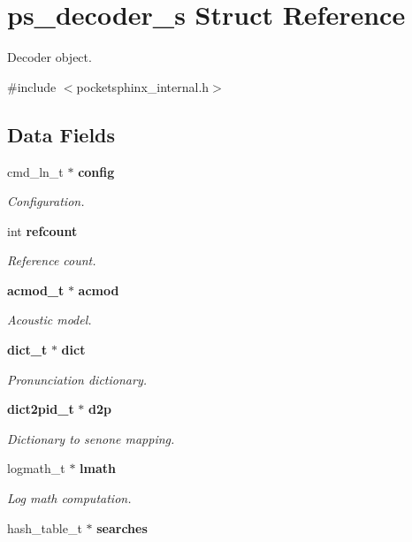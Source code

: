 \section{ps\+\_\+decoder\+\_\+s Struct Reference}
\label{structps__decoder__s}


Decoder object.  




{\ttfamily \#include $<$pocketsphinx\+\_\+internal.\+h$>$}

\subsection*{Data Fields}
\begin{DoxyCompactItemize}
\item 
cmd\+\_\+ln\+\_\+t $\ast$ \textbf{ config}
\begin{DoxyCompactList}\small\item\em Configuration. \end{DoxyCompactList}\item 
int \textbf{ refcount}
\begin{DoxyCompactList}\small\item\em Reference count. \end{DoxyCompactList}\item 
\textbf{ acmod\+\_\+t} $\ast$ \textbf{ acmod}
\begin{DoxyCompactList}\small\item\em Acoustic model. \end{DoxyCompactList}\item 
\textbf{ dict\+\_\+t} $\ast$ \textbf{ dict}
\begin{DoxyCompactList}\small\item\em Pronunciation dictionary. \end{DoxyCompactList}\item 
\textbf{ dict2pid\+\_\+t} $\ast$ \textbf{ d2p}
\begin{DoxyCompactList}\small\item\em Dictionary to senone mapping. \end{DoxyCompactList}\item 
logmath\+\_\+t $\ast$ \textbf{ lmath}
\begin{DoxyCompactList}\small\item\em Log math computation. \end{DoxyCompactList}\item 
hash\+\_\+table\+\_\+t $\ast$ \textbf{ searches}

\end{DoxyCompactItemize}
